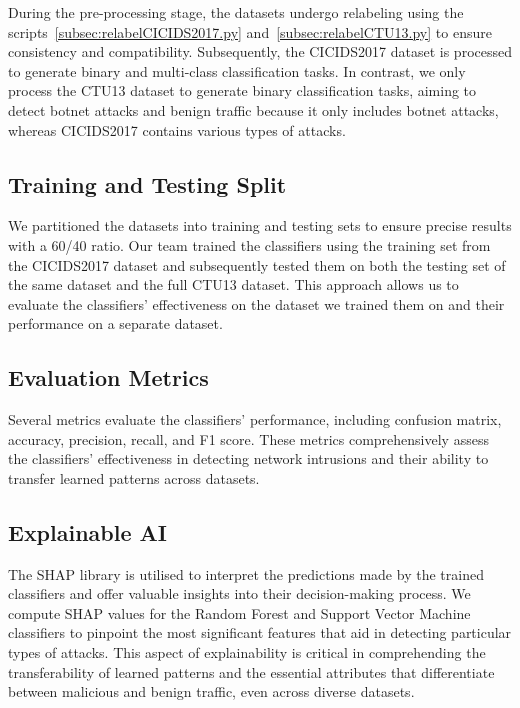 During the pre-processing stage, the datasets undergo relabeling using the scripts~\ref{subsec:relabelCICIDS2017.py} and~\ref{subsec:relabelCTU13.py} to ensure consistency and compatibility. Subsequently, the CICIDS2017 dataset is processed to generate binary and multi-class classification tasks. In contrast, we only process the CTU13 dataset to generate binary classification tasks, aiming to detect botnet attacks and benign traffic because it only includes botnet attacks, whereas CICIDS2017 contains various types of attacks.

\subsection{Training and Testing Split}\label{subsec:TrainingTestingSplit}

We partitioned the datasets into training and testing sets to ensure precise results with a 60/40 ratio. Our team trained the classifiers using the training set from the CICIDS2017 dataset and subsequently tested them on both the testing set of the same dataset and the full CTU13 dataset. This approach allows us to evaluate the classifiers' effectiveness on the dataset we trained them on and their performance on a separate dataset.

\subsection{Evaluation Metrics}\label{subsec:EvaluationMetrics}

Several metrics evaluate the classifiers' performance, including confusion matrix, accuracy, precision, recall, and F1 score. These metrics comprehensively assess the classifiers' effectiveness in detecting network intrusions and their ability to transfer learned patterns across datasets.

\subsection{Explainable AI}\label{subsec:ExplainableAI}

The SHAP library is utilised to interpret the predictions made by the trained classifiers and offer valuable insights into their decision-making process. We compute SHAP values for the Random Forest and Support Vector Machine classifiers to pinpoint the most significant features that aid in detecting particular types of attacks. This aspect of explainability is critical in comprehending the transferability of learned patterns and the essential attributes that differentiate between malicious and benign traffic, even across diverse datasets.

